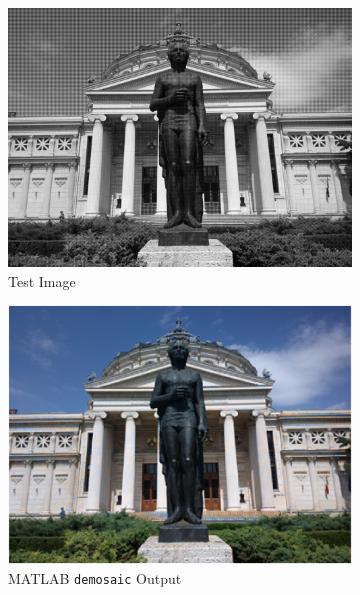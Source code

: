 \documentclass[12pt]{article}
\begin{document}
\begin{figure}[htp]
    \centering
    \begin{subfigure}[b]{0.53\textwidth}
        \centering
        \includegraphics[width=\textwidth]{test1}
        \caption{Test Image}
        \label{fig:test1_mosaic}
    \end{subfigure}
    \hfill
    \begin{subfigure}[b]{0.53\textwidth}
        \centering
        \includegraphics[width=\textwidth]{test1_matlab}
        \caption{MATLAB \texttt{demosaic} Output}
        \label{fig:test1_matlab}
    \end{subfigure}
    \hfill
    \begin{subfigure}[b]{0.53\textwidth}

\end{subfigure}
\end{figure}
\end{document}
